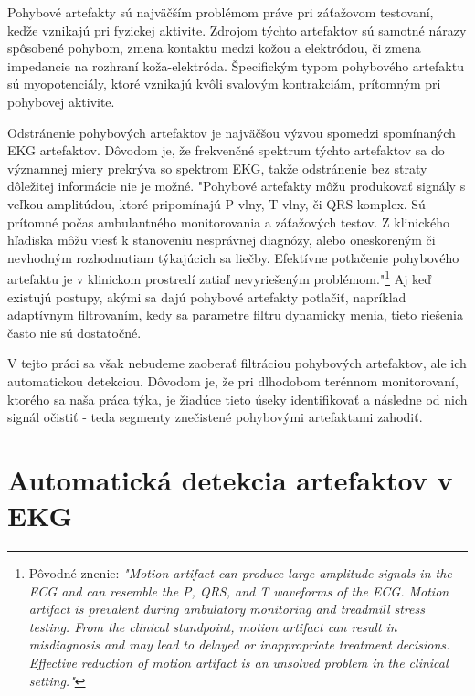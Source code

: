 Pohybové artefakty sú najväčším problémom práve pri záťažovom testovaní, keďže vznikajú pri fyzickej aktivite. Zdrojom týchto artefaktov sú samotné nárazy spôsobené pohybom, zmena kontaktu medzi kožou a elektródou, či zmena impedancie na rozhraní koža-elektróda.\cite{Kirst2011} Špecifickým typom pohybového artefaktu sú myopotenciály, ktoré vznikajú kvôli svalovým kontrakciám,  prítomným pri pohybovej aktivite. 

Odstránenie pohybových artefaktov je najväčšou výzvou spomedzi spomínaných EKG artefaktov. Dôvodom je, že frekvenčné spektrum týchto artefaktov sa do významnej miery prekrýva so spektrom EKG, takže odstránenie bez straty dôležitej informácie nie je možné.\cite{Li2020} "Pohybové artefakty môžu produkovať signály s veľkou amplitúdou, ktoré pripomínajú P-vlny, T-vlny, či QRS-komplex. Sú prítomné počas ambulantného monitorovania a záťažových testov. Z klinického hľadiska môžu viesť k stanoveniu nesprávnej diagnózy, alebo oneskoreným či nevhodným rozhodnutiam týkajúcich sa liečby. Efektívne potlačenie pohybového artefaktu je v klinickom prostredí zatiaľ nevyriešeným problémom."\footnote{Pôvodné znenie: \textit{"Motion artifact can produce large amplitude signals in the ECG and can resemble the P, QRS, and T waveforms of the ECG. Motion artifact is prevalent during ambulatory monitoring and treadmill stress testing. From the clinical standpoint, motion artifact can result in misdiagnosis and may lead to delayed or inappropriate treatment decisions. Effective reduction of motion artifact is an unsolved problem in the clinical setting."}}\cite{Tong} Aj keď existujú postupy, akými sa dajú pohybové artefakty potlačiť, napríklad adaptívnym filtrovaním, kedy sa parametre filtru dynamicky menia\cite{Kirst2011}\cite{Tong}, tieto riešenia často nie sú dostatočné. 

V tejto práci sa však nebudeme zaoberať filtráciou pohybových artefaktov, ale ich automatickou detekciou. Dôvodom je, že pri dlhodobom terénnom monitorovaní, ktorého sa naša práca týka, je žiadúce tieto úseky identifikovať a následne od nich signál očistiť - teda segmenty znečistené pohybovými artefaktami zahodiť.


\section{Automatická detekcia artefaktov v EKG}

